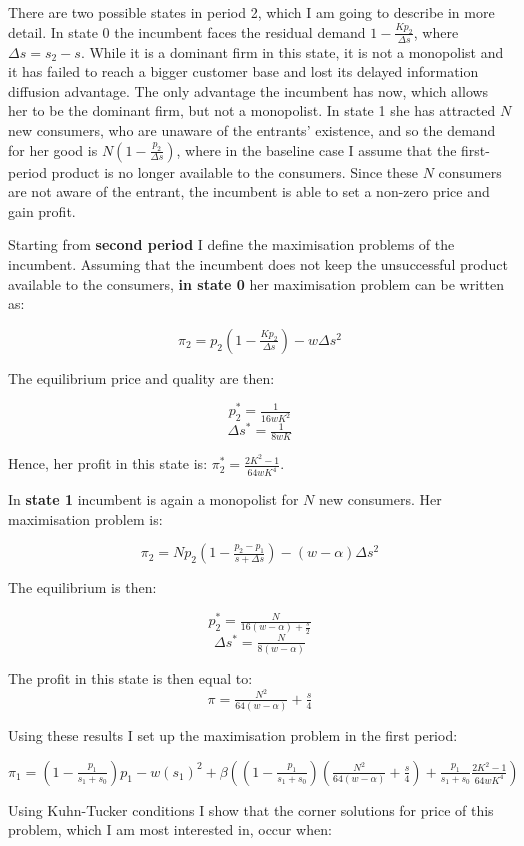 \documentclass{article}
\numberwithin{figure}{section}
\numberwithin{table}{section}
\theoremstyle{indented}
\numberwithin{equation}{section} %
\begin{document}
There are two possible states in period 2, which I am going to describe in more detail. In state 0 the incumbent faces the residual demand $1-\tfrac{Kp_2}{\Delta s}$, where $\Delta s = s_2-s$. While it is a dominant firm in this state, it is not a monopolist and it has failed to reach a bigger customer base and lost its delayed information diffusion advantage. The only advantage the incumbent has now, which allows her to be the dominant firm, but not a monopolist.   In state 1 she has attracted $N$ new consumers, who are unaware of the entrants' existence, and so the demand for her good is  $N(1-\tfrac{p_2}{\Delta s})$, where in the baseline case I assume that the first-period product is no longer available to the consumers. Since these $N$ consumers are not aware of the entrant, the incumbent is able to set a non-zero price and gain profit.


Starting from \textbf{second period} I define the maximisation problems of the incumbent. 
Assuming that the incumbent does not keep the unsuccessful product available to the consumers, \textbf{in state 0} her maximisation problem can be written as:

$$\pi_2 = p_2(1-\tfrac{Kp_2}{\Delta s}) - w\Delta s^2$$

The equilibrium price and quality are then:

$$p_2^* = \tfrac{1}{16wK^2}$$
$$\Delta s^* = \tfrac{1}{8wK}$$

Hence, her profit in this state is: $\pi^*_2 = \tfrac{2K^2-1}{64wK^4}$.

In \textbf{state 1} incumbent is again a monopolist for $N$ new consumers. Her maximisation problem is:

$$\pi_2 = Np_2(1-\tfrac{p_2 - p_1}{s+\Delta s}) - (w-\alpha)\Delta s^2$$

The equilibrium is then:

$$p_2^* = \tfrac{N}{16(w-\alpha) + \tfrac{s}{2}}$$
$$\Delta s^* = \tfrac{N}{8(w-\alpha)}$$

The profit in this state is then equal to:
$$\pi = \tfrac{N^2}{64(w-\alpha)}+ \tfrac{s}{4}$$

Using these results I set up the maximisation problem in the first period:

$$\pi_1 = (1-\tfrac{p_1}{s_1+s_0})p_1 - w(s_1)^2+\beta ((1-\tfrac{p_1}{s_1+s_0})(\tfrac{N^2}{64(w-\alpha)}+ \tfrac{s}{4})+\tfrac{p_1}{s_1+s_0}\tfrac{2K^2-1}{64wK^4})$$

Using Kuhn-Tucker conditions I show that the corner solutions for price of this problem, which I am most interested in, occur when:
\end{document}
